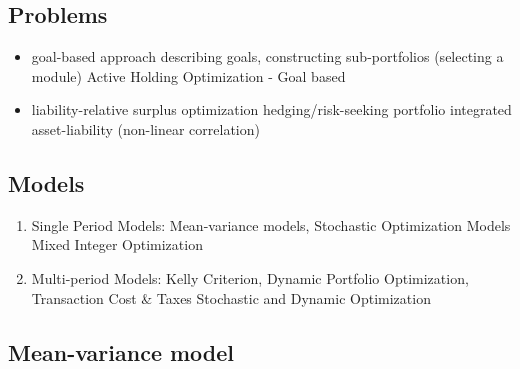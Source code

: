 \documentclass[11pt, openany]{book}              %
\begin{document}
\subsection{Problems}

\begin{itemize}
	\item goal-based approach
        \subitem describing goals, constructing sub-portfolios (selecting a module)
        \subitem Active Holding Optimization - Goal based
	 \item liability-relative
         \subitem surplus optimization
        \subitem hedging/risk-seeking portfolio
         \subitem integrated asset-liability (non-linear correlation)
\end{itemize}

\subsection{Models}

\begin{enumerate}
	\item Single Period Models: Mean-variance models, Stochastic Optimization Models
		\subitem  Mixed Integer Optimization
	\item Multi-period Models: Kelly Criterion, Dynamic Portfolio Optimization, Transaction Cost \& Taxes
		\subitem  Stochastic and Dynamic Optimization
\end{enumerate}

\subsection{Mean-variance model}
\end{document}
